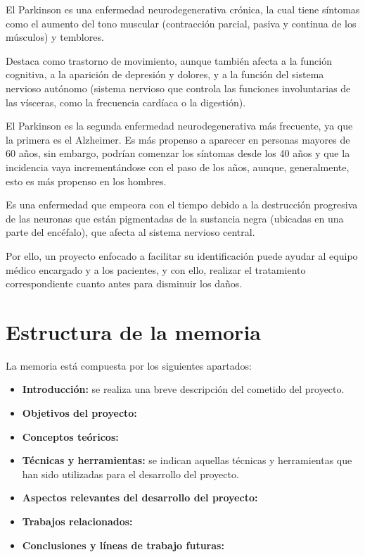 El Parkinson\cite{parkinson} es una enfermedad neurodegenerativa crónica, la cual tiene síntomas como el aumento del tono muscular\cite{tonomuscular} (contracción parcial, pasiva y continua de los músculos) y temblores.

Destaca como trastorno de movimiento, aunque también afecta a la función cognitiva, a la aparición de depresión y dolores, y a la función del sistema nervioso autónomo\cite{sistnervautonomo} (sistema nervioso que controla las funciones involuntarias de las vísceras, como la frecuencia cardíaca o la digestión).

El Parkinson es la segunda enfermedad neurodegenerativa más frecuente, ya que la primera es el Alzheimer. Es más propenso a aparecer en personas mayores de 60 años, sin embargo, podrían comenzar los síntomas desde los 40 años y que la incidencia vaya incrementándose con el paso de los años, aunque, generalmente, esto es más propenso en los hombres.

Es una enfermedad que empeora con el tiempo debido a la destrucción progresiva de las neuronas que están pigmentadas de la sustancia negra\cite{sustancianegra} (ubicadas en una parte del encéfalo), que afecta al sistema nervioso central.

Por ello, un proyecto enfocado a facilitar su identificación puede ayudar al equipo médico encargado y a los pacientes, y con ello, realizar el tratamiento correspondiente cuanto antes para disminuir los daños.

\section{Estructura de la memoria}
La memoria está compuesta por los siguientes apartados:
\begin{itemize}
	\item \textbf{Introducción:} se realiza una breve descripción del cometido del proyecto.
	\item \textbf{Objetivos del proyecto:}
	\item \textbf{Conceptos teóricos:}
	\item \textbf{Técnicas y herramientas:} se indican aquellas técnicas y herramientas que han sido utilizadas para el desarrollo del proyecto.
	\item \textbf{Aspectos relevantes del desarrollo del proyecto:}
	\item \textbf{Trabajos relacionados:}
	\item \textbf{Conclusiones y líneas de trabajo futuras:}
\end{itemize}

